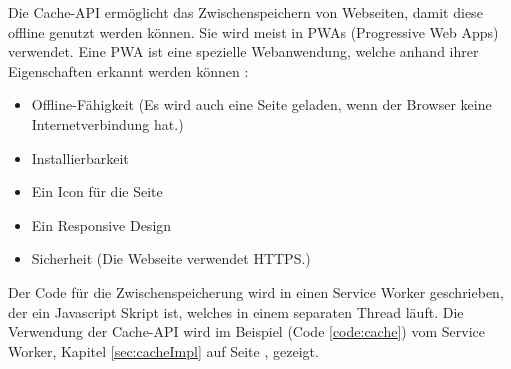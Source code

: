 
Die Cache-API ermöglicht das Zwischenspeichern von Webseiten, damit diese offline genutzt werden können.
Sie wird meist in PWAs (Progressive Web Apps) verwendet. Eine PWA ist eine spezielle Webanwendung, welche anhand ihrer Eigenschaften erkannt werden können \cite{datacodedesignPWA}:
\begin{itemize}
    \item Offline-Fähigkeit (Es wird auch eine Seite geladen, wenn der Browser keine Internetverbindung hat.)
    \item Installierbarkeit 
    \item Ein Icon für die Seite
    \item Ein Responsive Design
    \item Sicherheit (Die Webseite verwendet HTTPS.)
\end{itemize}

Der Code für die Zwischenspeicherung wird in einen Service Worker geschrieben, der ein Javascript Skript ist, welches in einem separaten Thread läuft. 
Die Verwendung der Cache-API wird im Beispiel (Code \ref{code:cache}) vom Service Worker, Kapitel \ref{sec:cacheImpl} auf Seite \pageref{code:cache}, gezeigt.